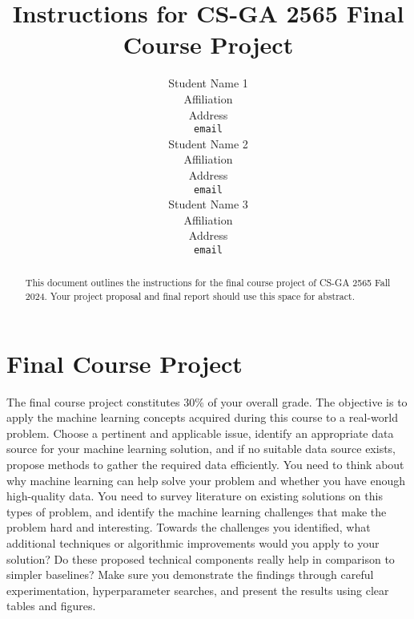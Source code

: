 \documentclass{article}
\title{Instructions for CS-GA 2565 Final Course Project}
\author{
  Student Name 1 \\
  Affiliation \\
  Address \\
  \texttt{email} \\
  \And
  Student Name 2 \\
  Affiliation \\
  Address \\
  \texttt{email} \\
  \And
  Student Name 3 \\
  Affiliation \\
  Address \\
  \texttt{email} \\
}
\begin{document}
\maketitle

\begin{abstract}
  This document outlines the instructions for the final course project of CS-GA 2565 Fall 2024. Your project proposal and final report should use this space for abstract.
\end{abstract}

\section{Final Course Project}
The final course project constitutes 30\% of your overall grade. The objective is to apply the machine learning concepts acquired during this course to a real-world problem. Choose a pertinent and applicable issue, identify an appropriate data source for your machine learning solution, and if no suitable data source exists, propose methods to gather the required data efficiently. You need to think about why machine learning can help solve your problem and whether you have enough high-quality data. You need to survey literature on existing solutions on this types of problem, and identify the machine learning challenges that make the problem hard and interesting. Towards the challenges you identified, what additional techniques or algorithmic improvements would you apply to your solution? Do these proposed technical components really help in comparison to simpler baselines? Make sure you demonstrate the findings through careful experimentation, hyperparameter searches, and present the results using clear tables and figures.
\end{document}
